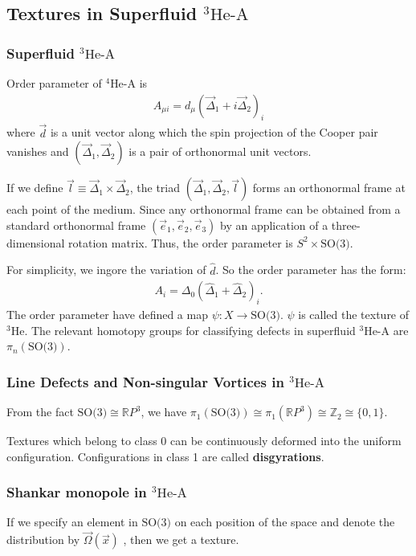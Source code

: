\documentclass[10pt]{article}
\begin{document}
\subsection{Textures in Superfluid \texorpdfstring{{}$^3\text{He-A}$}{}}
\subsubsection{Superfluid \texorpdfstring{{}$^3\text{He-A}$}{}}
Order parameter of $^4$He-A is
\begin{align}
    A_{\mu i}=d_\mu (\vec{\Delta}_1+i\vec{\Delta}_2)_i
\end{align}
where $\vec{d}$ is a unit vector along which the spin projection of the Cooper pair vanishes and $\left(\vec{\Delta}_1,\vec{\Delta}_2\right)$ is a pair of orthonormal unit vectors.

If we define $\vec{l}\equiv\vec{\Delta}_1\times\vec{\Delta}_2$, the triad $(\vec{\Delta}_1,\vec{\Delta}_2,\vec{l})$ forms an orthonormal frame at each point of the medium.
Since any orthonormal frame can be obtained from a standard orthonormal frame $(\vec{e}_1,\vec{e}_2,\vec{e}_3)$ by an application of a three-dimensional rotation matrix.
Thus, the order parameter is $S^2\times\text{SO(3)}$.

For simplicity, we ingore the variation of $\hat{d}$.
So the order parameter has the form:
\begin{align}
    A_i=\Delta_0\left(\hat{\Delta}_1+\hat{\Delta}_2\right)_i.
\end{align}
The order parameter have defined a map $\psi:X\to\text{SO(3)}$.
$\psi$ is called the texture of $^3\text{He}$.
The relevant homotopy groups for classifying defects in superfluid $^3\text{He-A}$ are $\pi_n(\text{SO(3)})$.

\subsubsection{Line Defects and Non-singular Vortices in \texorpdfstring{$^3\text{He-A}$}{}}
From the fact $\text{SO(3)}\cong\mathbb{R}P^3$, we have $\pi_1(\text{SO(3)})\cong\pi_1(\mathbb{R}P^3)\cong\mathbb{Z}_2\cong\{0,1\}$.

Textures which belong to class 0 can be continuously deformed into the uniform configuration.
Configurations in class 1 are called \textbf{disgyrations}.

\subsubsection{Shankar monopole in \texorpdfstring{$^3\text{He-A}$}{}}
If we specify an element in $\text{SO(3)}$ on each position of the space and denote the distribution by $\vec{\Omega}\left(\vec{x}\right)$ , then we get a texture.
\end{document}
